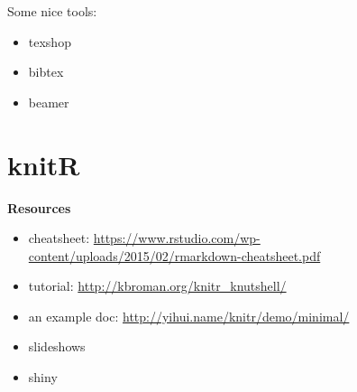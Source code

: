 \documentclass{article}
\begin{document}
Some nice tools:

\begin{itemize}
  \item texshop
  \item bibtex
  \item beamer
\end{itemize}

\section{knitR}

\textbf{Resources}
\begin{itemize}
  \item cheatsheet: \url{https://www.rstudio.com/wp-content/uploads/2015/02/rmarkdown-cheatsheet.pdf}
  \item tutorial: \url{http://kbroman.org/knitr_knutshell/}
  \item an example doc: \url{http://yihui.name/knitr/demo/minimal/}
  \item slideshows
  \item shiny

\end{itemize}
\end{document}
